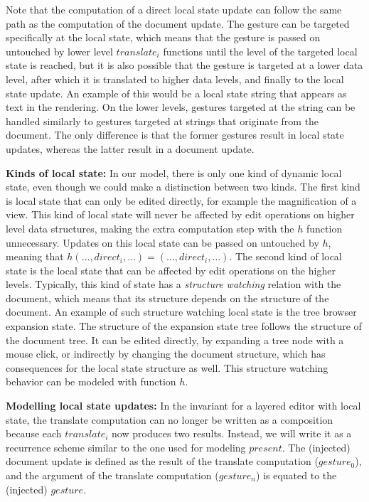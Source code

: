 \documentclass[twoside,epsf]{report}
\begin{document}
Note that the computation of a direct local state update can follow the same path as the computation of the document update. The gesture can be targeted specifically at the local state, which means that the gesture is passed on untouched by lower level $translate_i$ functions until the level of the targeted local state is reached, but it is also possible that the gesture is targeted at a lower data level, after which it is translated to higher data levels, and finally to the local state update. An example of this would be a local state string that appears as text in the rendering. On the lower levels, gestures targeted at the string can be handled similarly to gestures targeted at strings that originate from the document. The only difference is that the former gestures result in local state updates, whereas the latter result in a document update.

{\bf Kinds of local state: }In our model, there is only one kind of dynamic local state, even though we could make a distinction between two kinds. The first kind is local state that can only be edited directly, for example the magnification of a view. This kind of local \pagebreak state will never be affected by edit operations on higher level data structures, making the extra computation step with the $h$ function unnecessary. Updates on this local state can be passed on untouched by $h$, meaning that $h (\dots, direct_i,\dots) = (\dots, direct_i, \dots)$. The second kind of local state is the local state that can be affected by edit operations on the higher levels. Typically, this kind of state has a {\em structure watching} relation with the document, which means that its structure depends on the structure of the document. An example of such structure watching local state is the tree browser expansion state. The structure of the expansion state tree follows the structure of the document tree.  It can be edited directly, by expanding a tree node with a mouse click, or indirectly by changing the document structure, which has consequences for the local state structure as well. This structure watching behavior can be modeled with function $h$.







{\bf Modelling local state updates: }In the invariant for a layered editor with local state, the translate computation can no longer be written as a composition because each $translate_i$ now produces two results. Instead, we will write it as a recurrence scheme similar to the one used for modeling $present$. The (injected) document update is defined as the result of the translate computation ($gesture_0$), and the argument of the translate computation ($gesture_n$) is equated to the (injected) $gesture$. 
\end{document}
